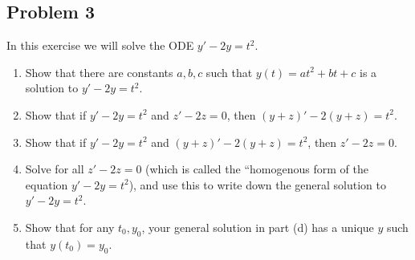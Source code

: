 \documentclass{article}
\begin{document}
\subsection*{Problem 3}
In this exercise we will solve the ODE $y' - 2y = t^2$.
\begin{enumerate}
	\item Show that there are constants $a,b,c$ such that
		$y(t) = at^2 + bt + c$ is a solution to $y' - 2y = t^2$.
	\item Show that if $y' - 2y = t^2$ and $z' - 2z = 0$,
		then $(y+z)' - 2(y+z) = t^2$.
	\item Show that if $y' - 2y = t^2$ and $(y+z)' - 2(y+z) = t^2$, then $z' - 2z = 0$.
	\item Solve for all $z' - 2z = 0$ (which is called the
		``homogenous form of the equation $y' - 2y = t^2$),
		and use this to write down the general solution to $y' - 2y = t^2$.
	\item Show that for any $t_0,y_0$, your general solution in part (d)
		has a unique $y$ such that $y(t_0) = y_0$.
\end{enumerate}
\end{document}
